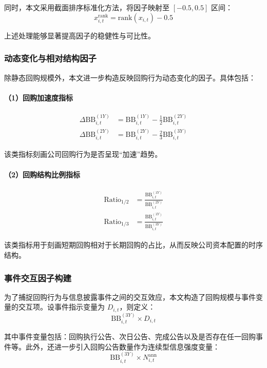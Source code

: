 \documentclass[a4paper,10pt]{article}
\begin{document}
同时，本文采用截面排序标准化方法，将因子映射至 $[-0.5, 0.5]$ 区间：
\begin{equation}
x^{\text{rank}}_{i,t} = \text{rank}(x_{i,t}) - 0.5
\end{equation}

上述处理能够显著提高因子的稳健性与可比性。

\subsubsection{动态变化与相对结构因子}

除静态回购规模外，本文进一步构造反映回购行为动态变化的因子。具体包括：

\paragraph{（1）回购加速度指标}
\begin{align}
\Delta \text{BB}^{(1Y)}_{i,t} &= \text{BB}^{(1Y)}_{i,t} - \frac{1}{2}\text{BB}^{(2Y)}_{i,t} \\
\Delta \text{BB}^{(2Y)}_{i,t} &= \text{BB}^{(2Y)}_{i,t} - \frac{2}{3}\text{BB}^{(3Y)}_{i,t}
\end{align}

该类指标刻画公司回购行为是否呈现“加速”趋势。

\paragraph{（2）回购结构比例指标}
\begin{align}
\text{Ratio}_{1/2} &= \frac{\text{BB}^{(1Y)}_{i,t}}{\text{BB}^{(2Y)}_{i,t}} \\
\text{Ratio}_{1/3} &= \frac{\text{BB}^{(1Y)}_{i,t}}{\text{BB}^{(3Y)}_{i,t}}
\end{align}

该类指标用于刻画短期回购相对于长期回购的占比，从而反映公司资本配置的时序结构。

\subsubsection{事件交互因子构建}

为了捕捉回购行为与信息披露事件之间的交互效应，本文构造了回购规模与事件变量的交互项。设事件指示变量为 $D_{i,t}$，则定义：
\begin{equation}
\text{BB}^{(3Y)}_{i,t} \times D_{i,t}
\end{equation}

其中事件变量包括：回购执行公告、次日公告、完成公告以及是否存在任一回购事件等。此外，还进一步引入回购公告数量作为连续型信息强度变量：
\begin{equation}
\text{BB}^{(3Y)}_{i,t} \times N^{\text{ann}}_{i,t}
\end{equation}
\end{document}
